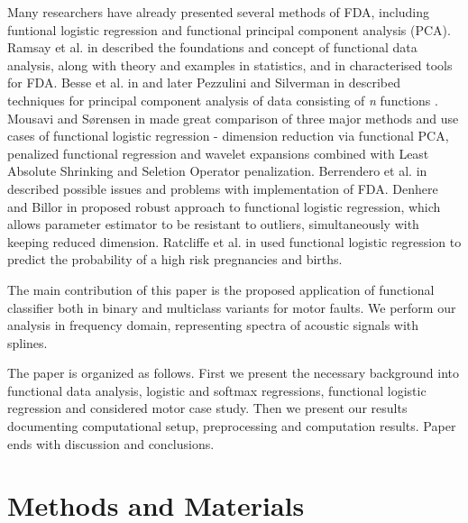 \documentclass[energies,article,submit,pdftex,moreauthors]{Definitions/mdpi}
\begin{document}
Many researchers have already presented several methods of FDA, including funtional logistic regression  and functional principal component analysis (PCA). Ramsay et al. in \cite{ramsay-logreg2, ramsay1982data} described the foundations and concept of functional data analysis, along with theory and examples in statistics, and in \cite{ramsay-logreg} characterised tools for FDA. Besse et al. in  \cite{besse-pca} and later Pezzulini and Silverman in \cite{pezzulini-pca} described techniques for principal component analysis of data consisting of \textit{n} functions . Mousavi and Sørensen in  \cite{logreg-comparison} made great comparison of three major methods and use cases of functional logistic regression - dimension reduction via functional PCA, penalized functional regression and wavelet expansions combined with Least Absolute Shrinking and Seletion Operator penalization. Berrendero et al. in \cite{logreg-issues} described possible issues and problems with implementation of FDA. Denhere and Billor in \cite{denhere-robust-logreg} proposed robust approach to functional logistic regression, which allows parameter estimator to be resistant to outliers, simultaneously with keeping reduced dimension. Ratcliffe et al. in \cite{ratcliffe-pregnancies} used functional logistic regression to predict the probability of a high risk pregnancies and births. 


The main contribution of this paper is the proposed application of functional classifier  both in binary and multiclass variants for motor faults. We perform our analysis in frequency domain, representing spectra of acoustic signals with splines. 

The paper is organized as follows. First we present the necessary background into functional data analysis, logistic and softmax regressions, functional logistic regression and considered motor case study. Then we present our results documenting computational setup, preprocessing and computation results. Paper ends with discussion and conclusions.


\section{Methods and Materials}
\end{document}
